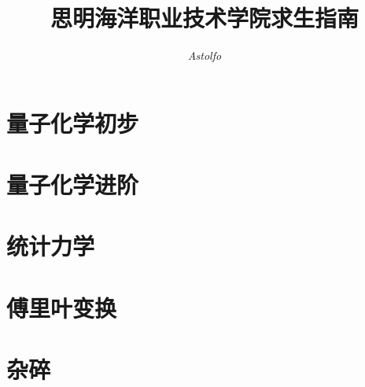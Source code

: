 \documentclass[lang=cn,10pt]{elegantbook}
\title{思明海洋职业技术学院求生指南}
\author{\textit{Astolfo}}
\begin{document}
\maketitle
\frontmatter


\mainmatter
\tableofcontents
\chapter{量子化学初步}

\chapter{量子化学进阶}

\chapter{统计力学}

%
\chapter{傅里叶变换}

%
\chapter{杂碎}

\end{document}

